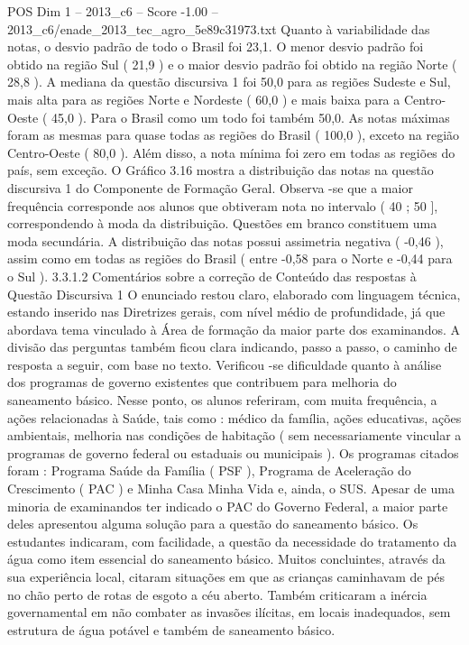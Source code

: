 \begin{textsample}{POS Dim 1 – 2013\_c6 – Score -1.00 – 2013\_c6/enade\_2013\_tec\_agro\_5e89c31973.txt}
Quanto à variabilidade das notas, o desvio padrão de todo o Brasil foi 23,1.
O menor desvio padrão foi obtido na região Sul ( 21,9 ) e o maior desvio padrão foi obtido na região Norte ( 28,8 ).
A mediana da questão discursiva 1 foi 50,0 para as regiões Sudeste e Sul, mais alta para as regiões Norte e Nordeste ( 60,0 ) e mais baixa para a Centro-Oeste ( 45,0 ).
Para o Brasil como um todo foi também 50,0.
As notas máximas foram as mesmas para quase todas as regiões do Brasil ( 100,0 ), exceto na região Centro-Oeste ( 80,0 ).
Além disso, a nota mínima foi zero em todas as regiões do país, sem exceção.
O Gráfico 3.16 mostra a distribuição das notas na questão discursiva 1 do Componente de Formação Geral.
Observa -se que a maior frequência corresponde aos alunos que obtiveram nota no intervalo ( 40 ; 50 ], correspondendo à moda da distribuição.
Questões em branco constituem uma moda secundária.
A distribuição das notas possui assimetria negativa ( -0,46 ), assim como em todas as regiões do Brasil ( entre -0,58 para o Norte e -0,44 para o Sul ). 3.3.1.2 Comentários sobre a correção de Conteúdo das respostas à Questão Discursiva 1 O enunciado restou claro, elaborado com linguagem técnica, estando inserido nas Diretrizes gerais, com nível médio de profundidade, já que abordava tema vinculado à Área de formação da maior parte dos examinandos.
A divisão das perguntas também ficou clara indicando, passo a passo, o caminho de resposta a seguir, com base no texto.
Verificou -se dificuldade quanto à análise dos programas de governo existentes que contribuem para melhoria do saneamento básico.
Nesse ponto, os alunos referiram, com muita frequência, a ações relacionadas à Saúde, tais como : médico da família, ações educativas, ações ambientais, melhoria nas condições de habitação ( sem necessariamente vincular a programas de governo federal ou estaduais ou municipais ).
Os programas citados foram : Programa Saúde da Família ( PSF ), Programa de Aceleração do Crescimento ( PAC ) e Minha Casa Minha Vida e, ainda, o SUS.
Apesar de uma minoria de examinandos ter indicado o PAC do Governo Federal, a maior parte deles apresentou alguma solução para a questão do saneamento básico.
Os estudantes indicaram, com facilidade, a questão da necessidade do tratamento da água como item essencial do saneamento básico.
Muitos concluintes, através da sua experiência local, citaram situações em que as crianças caminhavam de pés no chão perto de rotas de esgoto a céu aberto.
Também criticaram a inércia governamental em não combater as invasões ilícitas, em locais inadequados, sem estrutura de água potável e também de saneamento básico.

\end{textsample}
